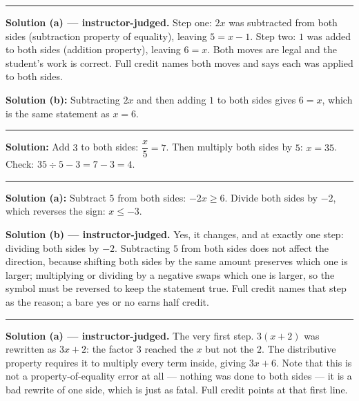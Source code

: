 \documentclass[12pt]{article}
\begin{document}
\vspace{0.15cm}\noindent\rule{\linewidth}{0.2pt}


\textbf{Solution (a) --- instructor-judged.} Step one: $2x$ was subtracted from both sides
(subtraction property of equality), leaving $5 = x - 1$. Step two: $1$ was added to both sides
(addition property), leaving $6 = x$. Both moves are legal and the student's work is correct. Full
credit names both moves and says each was applied to both sides.

\noindent\textbf{Solution (b):} \quad Subtracting $2x$ and then adding $1$ to both sides gives
$6 = x$, which is the same statement as $x = 6$. 

\vspace{0.15cm}\noindent\rule{\linewidth}{0.2pt}


\textbf{Solution:} \quad Add $3$ to both sides: $\dfrac{x}{5} = 7$. Then multiply both sides by $5$:
$x = 35$. Check: $35 \div 5 - 3 = 7 - 3 = 4$. 

\vspace{0.15cm}\noindent\rule{\linewidth}{0.2pt}


\textbf{Solution (a):} \quad Subtract $5$ from both sides: $-2x \ge 6$. Divide both sides by $-2$,
which reverses the sign: $x \le -3$. 

\noindent\textbf{Solution (b) --- instructor-judged.} Yes, it changes, and at exactly one step:
dividing both sides by $-2$. Subtracting $5$ from both sides does not affect the direction, because
shifting both sides by the same amount preserves which one is larger; multiplying or dividing by a
negative swaps which one is larger, so the symbol must be reversed to keep the statement true. Full
credit names that step as the reason; a bare yes or no earns half credit.

\vspace{0.15cm}\noindent\rule{\linewidth}{0.2pt}


\textbf{Solution (a) --- instructor-judged.} The very first step. $3(x + 2)$ was rewritten as
$3x + 2$: the factor $3$ reached the $x$ but not the $2$. The distributive property requires it to
multiply every term inside, giving $3x + 6$. Note that this is not a property-of-equality error at
all --- nothing was done to both sides --- it is a bad rewrite of one side, which is just as fatal.
Full credit points at that first line.
\end{document}
